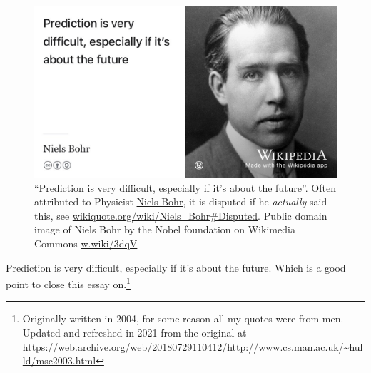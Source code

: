 \documentclass[
  12pt,
]{book}
\begin{document}
\begin{figure}

{\centering \includegraphics[width=0.99\linewidth]{images/niels-bohr-prediction} 

}

\caption{``Prediction is very difficult, especially if it's about the future''. Often attributed to Physicist \href{https://en.wikipedia.org/wiki/Niels_Bohr}{Niels Bohr}, it is disputed if he \emph{actually} said this, see \href{https://en.wikiquote.org/wiki/Niels_Bohr\#Disputed}{wikiquote.org/wiki/Niels\_Bohr\#Disputed}. Public domain image of Niels Bohr by the Nobel foundation on Wikimedia Commons \href{https://w.wiki/3dqV}{w.wiki/3dqV}}\label{fig:bohr-fig}
\end{figure}



Prediction is very difficult, especially if it's about the future. Which is a good point to close this essay on.\footnote{Originally written in 2004, for some reason all my quotes were from men. Updated and refreshed in 2021 from the original at \url{https://web.archive.org/web/20180729110412/http://www.cs.man.ac.uk/~hulld/msc2003.html}}

  
\end{document}
